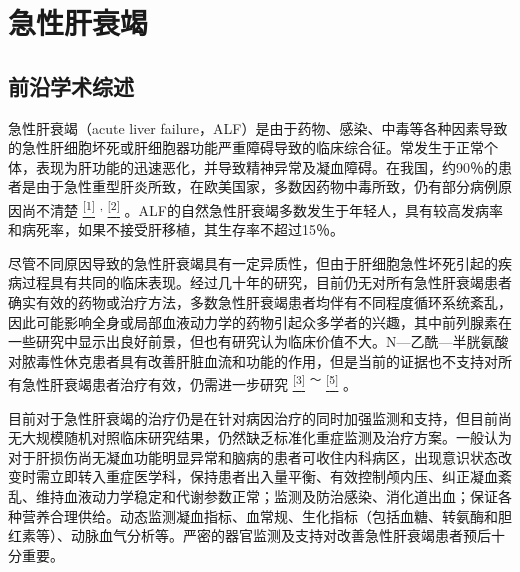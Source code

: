 \chapter{急性肝衰竭}

\section{前沿学术综述}

急性肝衰竭（acute liver
failure，ALF）是由于药物、感染、中毒等各种因素导致的急性肝细胞坏死或肝细胞器功能严重障碍导致的临床综合征。常发生于正常个体，表现为肝功能的迅速恶化，并导致精神异常及凝血障碍。在我国，约90％的患者是由于急性重型肝炎所致，在欧美国家，多数因药物中毒所致，仍有部分病例原因尚不清楚
\protect\hyperlink{text00019.htmlux5cux23ch1-18}{\textsuperscript{{[}1{]}}}
\textsuperscript{,}
\protect\hyperlink{text00019.htmlux5cux23ch2-18}{\textsuperscript{{[}2{]}}}
。ALF的自然急性肝衰竭多数发生于年轻人，具有较高发病率和病死率，如果不接受肝移植，其生存率不超过15％。

尽管不同原因导致的急性肝衰竭具有一定异质性，但由于肝细胞急性坏死引起的疾病过程具有共同的临床表现。经过几十年的研究，目前仍无对所有急性肝衰竭患者确实有效的药物或治疗方法，多数急性肝衰竭患者均伴有不同程度循环系统紊乱，因此可能影响全身或局部血液动力学的药物引起众多学者的兴趣，其中前列腺素在一些研究中显示出良好前景，但也有研究认为临床价值不大。N---乙酰---半胱氨酸对脓毒性休克患者具有改善肝脏血流和功能的作用，但是当前的证据也不支持对所有急性肝衰竭患者治疗有效，仍需进一步研究
\protect\hyperlink{text00019.htmlux5cux23ch3-18}{\textsuperscript{{[}3{]}}}
\textsuperscript{～}
\protect\hyperlink{text00019.htmlux5cux23ch5-18}{\textsuperscript{{[}5{]}}}
。

目前对于急性肝衰竭的治疗仍是在针对病因治疗的同时加强监测和支持，但目前尚无大规模随机对照临床研究结果，仍然缺乏标准化重症监测及治疗方案。一般认为对于肝损伤尚无凝血功能明显异常和脑病的患者可收住内科病区，出现意识状态改变时需立即转入重症医学科，保持患者出入量平衡、有效控制颅内压、纠正凝血紊乱、维持血液动力学稳定和代谢参数正常；监测及防治感染、消化道出血；保证各种营养合理供给。动态监测凝血指标、血常规、生化指标（包括血糖、转氨酶和胆红素等）、动脉血气分析等。严密的器官监测及支持对改善急性肝衰竭患者预后十分重要。

